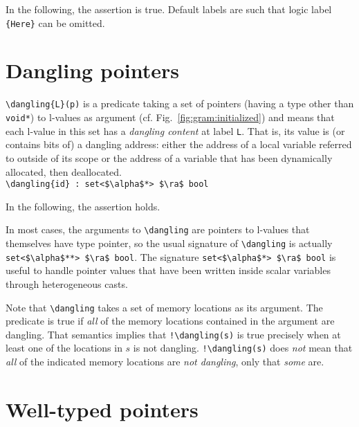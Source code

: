 \begin{example}
  In the following, the assertion is true.
  Default labels are 
  such that logic label \lstinline|{Here}| can be omitted.
\end{example}

\section{Dangling pointers}
\label{sec:dangling_pointers}
\lstinline|\dangling{L}(p)|
is a predicate taking a set of pointers
(having a type other than \lstinline|void*|) to l-values as
argument (cf. Fig.~\ref{fig:gram:initialized}) and means that each l-value in this set has a \emph{dangling
  content} at label \lstinline|L|. That is, its value is (or contains bits
of) a dangling address: either the address of a local
variable referred to outside of its scope or the address of a variable that
has been dynamically allocated, then deallocated.
\\ \makebox[5mm]{} \lstinline|\dangling{id} : set<$\alpha$*> $\ra$ bool|

\begin{example}
  In the following, the assertion holds.
\end{example}

In most cases, the arguments to \lstinline|\dangling| are pointers to
l-values that themselves have type pointer, so the usual signature
of \lstinline|\dangling| is actually
\lstinline|set<$\alpha$**> $\ra$ bool|.
The signature \lstinline|set<$\alpha$*> $\ra$ bool| is useful to handle
pointer values that have been written inside scalar variables through
heterogeneous casts.

Note that \lstinline|\dangling| takes a set of memory locations as its argument.
The predicate is true if \emph{all} of the memory locations contained in the argument are dangling. That
semantics implies that \lstinline|!\dangling(s)| is true precisely when at least one
of the locations in $s$ is not dangling. \lstinline|!\dangling(s)| does \emph{not} mean that 
\emph{all} of the indicated memory locations are \emph{not dangling}, only that \emph{some} are.

\section{Well-typed pointers}
\label{sec:welltyped}
\experimental
{}

